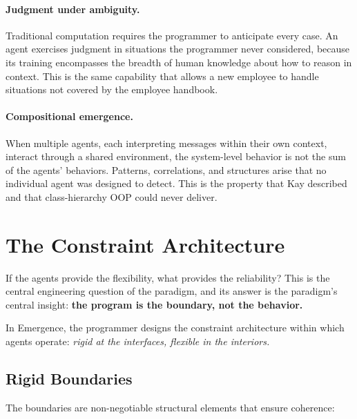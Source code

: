 \documentclass[11pt,twocolumn]{article}
\begin{document}
\paragraph{Judgment under ambiguity.}  Traditional computation requires
the programmer to anticipate every case.  An agent exercises judgment in
situations the programmer never considered, because its training
encompasses the breadth of human knowledge about how to reason in
context.  This is the same capability that allows a new employee to
handle situations not covered by the employee handbook.

\paragraph{Compositional emergence.}  When multiple agents, each
interpreting messages within their own context, interact through a
shared environment, the system-level behavior is not the sum of the
agents' behaviors.  Patterns, correlations, and structures arise that no
individual agent was designed to detect.  This is the property that Kay
described and that class-hierarchy OOP could never deliver.

\section{The Constraint Architecture}
\label{sec:constraints}

If the agents provide the flexibility, what provides the reliability?
This is the central engineering question of the paradigm, and its
answer is the paradigm's central insight: \textbf{the program is the
boundary, not the behavior.}

In Emergence, the programmer designs the constraint architecture within
which agents operate: \emph{rigid at the interfaces, flexible in the
interiors.}

\subsection{Rigid Boundaries}

The boundaries are non-negotiable structural elements that ensure
coherence:
\end{document}
